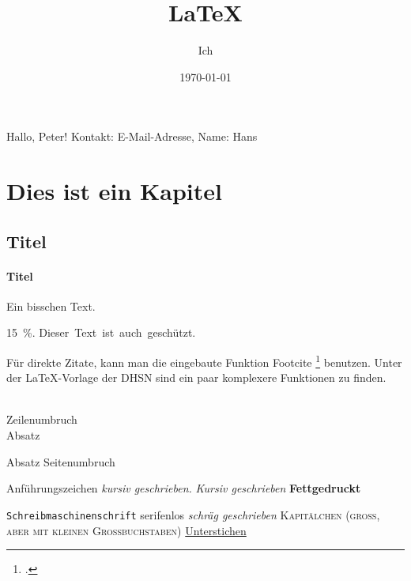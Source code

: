 \documentclass[a4paper, 12pt]{article}
\title{LaTeX}
\author{Ich}
\date{\today}
\newcommand{\gruss}[1]{Hallo, #1!}
\newcommand{\email}[2][E-Mail-Adresse]{Kontakt: #1, Name: #2}
\begin{document}
\gruss{Peter} %
\email{Hans} %

\maketitle
\tableofcontents %

\section{Dies ist ein Kapitel} %
\subsection{Titel} %
\paragraph{Titel} %


Ein bisschen Text.

15~\%. %
\mbox{Dieser Text ist auch geschützt.}

Für direkte Zitate, kann man die eingebaute Funktion Footcite \footcite[2]{psgithub} benutzen.
Unter der LaTeX-Vorlage der DHSN sind ein paar komplexere Funktionen zu finden.

\\          Zeilenumbruch
\\[0,5cm]   Absatz
\par        Absatz
\newpage    Seitenumbruch

\glqq{}Anführungszeichen\grqq{}
\textit{kursiv geschrieben.}
\emph{Kursiv geschrieben}
\textbf{Fettgedruckt}

\texttt{Schreibmaschinenschrift}
\textsf{serifenlos}
\textsl{schräg geschrieben}
\textsc{Kapitälchen (groß, aber mit kleinen Großbuchstaben)}
\underline{Unterstichen}
\end{document}
